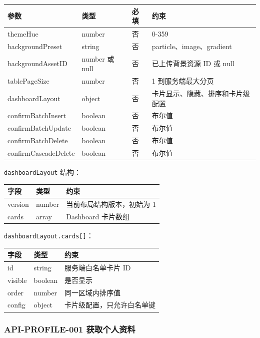 \documentclass[
  a4paper,
  UTF8]{ctexart}
\begin{document}
\begin{longtable}[]{@{}llll@{}}
\toprule
参数 & 类型 & 必填 & 约束 \\
\midrule
\endhead
themeHue & number & 否 & 0-359 \\
backgroundPreset & string & 否 & particle、image、gradient \\
backgroundAssetID & number 或 null & 否 & 已上传背景资源 ID 或 null \\
tablePageSize & number & 否 & 1 到服务端最大分页 \\
dashboardLayout & object & 否 & 卡片显示、隐藏、排序和卡片级配置 \\
confirmBatchInsert & boolean & 否 & 布尔值 \\
confirmBatchUpdate & boolean & 否 & 布尔值 \\
confirmBatchDelete & boolean & 否 & 布尔值 \\
confirmCascadeDelete & boolean & 否 & 布尔值 \\
\bottomrule
\end{longtable}

\texttt{dashboardLayout} 结构：

\begin{longtable}[]{@{}lll@{}}
\toprule
字段 & 类型 & 约束 \\
\midrule
\endhead
version & number & 当前布局结构版本，初始为 1 \\
cards & array & Dashboard 卡片数组 \\
\bottomrule
\end{longtable}

\texttt{dashboardLayout.cards{[}{]}}：

\begin{longtable}[]{@{}lll@{}}
\toprule
字段 & 类型 & 约束 \\
\midrule
\endhead
id & string & 服务端白名单卡片 ID \\
visible & boolean & 是否显示 \\
order & number & 同一区域内排序值 \\
config & object & 卡片级配置，只允许白名单键 \\
\bottomrule
\end{longtable}

\hypertarget{api-profile-001-ux83b7ux53d6ux4e2aux4ebaux8d44ux6599}{%
\subsubsection{API-PROFILE-001
获取个人资料}\label{api-profile-001-ux83b7ux53d6ux4e2aux4ebaux8d44ux6599}}
\end{document}
